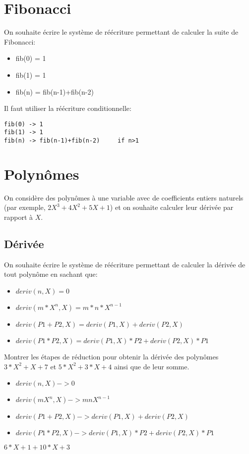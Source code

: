 \documentclass[11pt]{article}
\begin{document}
\section{Fibonacci}

On souhaite écrire le système de réécriture permettant de calculer la
suite de Fibonacci:
\begin{itemize}
\item[] fib(0) = 1
\item[] fib(1) = 1
\item[] fib(n) = fib(n-1)+fib(n-2)
\end{itemize}

\begin{versionProf}
Il faut utiliser la réécriture conditionnelle: 
\begin{verbatim}
fib(0) -> 1
fib(1) -> 1
fib(n) -> fib(n-1)+fib(n-2)     if n>1
\end{verbatim}
\end{versionProf}


\section{Polynômes}

On considère des polynômes à une variable avec de coefficients entiers
naturels (par exemple, $2X^3+4X^2+5X+1$) et on souhaite calculer leur
dérivée par rapport à $X$.

\subsection{Dérivée}
On souhaite écrire le système de réécriture permettant de calculer la
dérivée de tout polynôme en sachant que:
\begin{itemize}
\item[] $deriv(n,X) = 0$
\item[] $deriv(m*X^n,X) = m*n*X^{n-1}$
\item[] $deriv(P1+P2,X) = deriv(P1,X) + deriv(P2,X)$
\item[] $deriv(P1*P2,X) = deriv(P1,X) * P2 + deriv(P2,X) * P1$
\end{itemize}

Montrer les étapes de réduction pour obtenir la dérivée des polynômes
$3*X^2+X+7$ et $5*X^2+3*X+4$ ainsi que de leur somme.

\begin{versionProf}
\begin{itemize}
\item[] $deriv(n,X) -> 0$
\item[] $deriv(mX^n,X) -> mnX^{n-1}$
\item[] $deriv(P1+P2,X) -> deriv(P1,X) + deriv(P2,X)$
\item[] $deriv(P1*P2,X) -> deriv(P1,X) * P2 + deriv(P2,X) * P1$
\end{itemize}

$6*X+1 + 10*X+3$
\end{versionProf}
\end{document}
